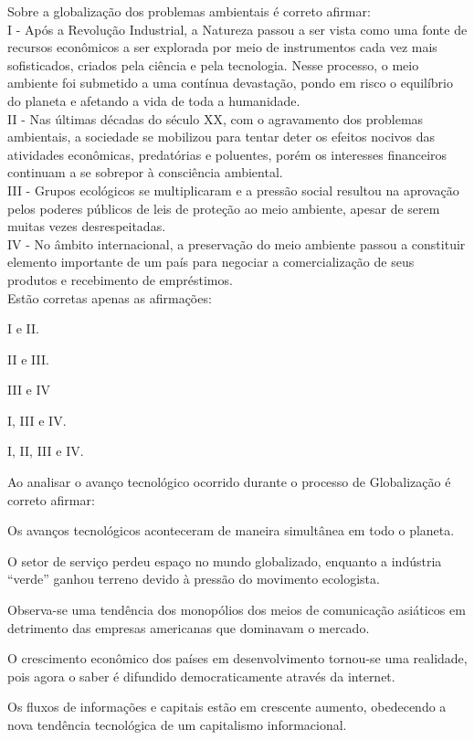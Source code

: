 \questao
Sobre a globalização dos problemas ambientais é correto afirmar:\\
I - Após a Revolução Industrial, a Natureza passou a ser vista como uma fonte de recursos econômicos a ser explorada por meio de instrumentos cada vez mais sofisticados, criados pela ciência e pela tecnologia. Nesse processo, o meio ambiente foi submetido a uma contínua devastação, pondo em risco o equilíbrio do planeta e afetando a vida de toda a humanidade.\\
II - Nas últimas décadas do século XX, com o agravamento dos problemas ambientais, a sociedade se mobilizou para tentar deter os efeitos nocivos das atividades econômicas, predatórias e poluentes, porém os interesses financeiros continuam a se sobrepor à consciência ambiental.\\
III - Grupos ecológicos se multiplicaram e a pressão social resultou na aprovação pelos poderes públicos de leis de proteção ao meio ambiente, apesar de serem muitas vezes desrespeitadas.\\
IV - No âmbito internacional, a preservação do meio ambiente passou a constituir elemento importante de um país para negociar a comercialização de seus produtos e recebimento de empréstimos.\\
Estão corretas apenas as afirmações:
\begin{alternativas}
\item I e II.
\item II e III.
\item III e IV
\item I, III e IV.
\item I, II, III e IV.
\end{alternativas}

\questao
Ao analisar o avanço tecnológico ocorrido durante o processo de Globalização é correto afirmar:
\begin{alternativas}
\item Os avanços tecnológicos aconteceram de maneira simultânea em todo o planeta.
\item O setor de serviço perdeu espaço no mundo globalizado, enquanto a indústria “verde” ganhou terreno devido à pressão do movimento ecologista.
\item Observa-se uma tendência dos monopólios dos meios de comunicação asiáticos em detrimento das empresas americanas que dominavam o mercado.
\item O crescimento econômico dos países em desenvolvimento tornou-se uma realidade, pois agora o saber é difundido democraticamente através da internet.
\item Os fluxos de informações e capitais estão em crescente aumento, obedecendo a nova tendência tecnológica de um capitalismo informacional.
\end{alternativas}

